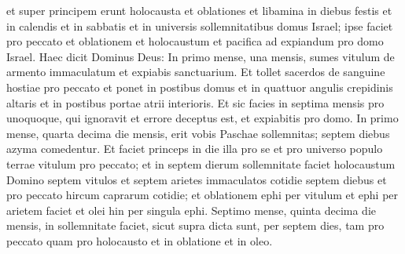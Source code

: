 \begin{biblechapter}
\begin{biblechapter}
\begin{biblechapter}
\begin{biblechapter}
\begin{biblechapter}
\begin{biblechapter}
\begin{biblechapter}
\begin{biblechapter}
\begin{biblechapter}
\begin{biblechapter}
\begin{biblechapter}
\begin{biblechapter}
\begin{biblechapter}
\begin{biblechapter}
\begin{biblechapter}
\begin{biblechapter}
\begin{biblechapter}
\begin{biblechapter}
\begin{biblechapter}
\begin{biblechapter}
\begin{biblechapter}
\begin{biblechapter}
\begin{biblechapter}
\begin{biblechapter}
\begin{biblechapter}
\begin{biblechapter}
\begin{biblechapter}
\begin{biblechapter}
\begin{biblechapter}
\begin{biblechapter}
\begin{biblechapter}
\begin{biblechapter}
\begin{biblechapter}
\begin{biblechapter}
\begin{biblechapter}
\begin{biblechapter}
\begin{biblechapter}
\begin{biblechapter}
\begin{biblechapter}
\begin{biblechapter}
\begin{biblechapter}
\begin{biblechapter}
\begin{biblechapter}
\begin{biblechapter}
\begin{biblechapter}
\verse et super principem erunt holocausta et oblationes et libamina in diebus festis et in calendis et in sabbatis et in universis sollemnitatibus domus Israel; ipse faciet pro peccato et oblationem et holocaustum et pacifica ad expiandum pro domo Israel.
 \verse Haec dicit Dominus Deus: In primo mense, una mensis, sumes vitulum de armento immaculatum et expiabis sanctuarium. 
\verse Et tollet sacerdos de sanguine hostiae pro peccato et ponet in postibus domus et in quattuor angulis crepidinis altaris et in postibus portae atrii interioris. 
\verse Et sic facies in septima mensis pro unoquoque, qui ignoravit et errore deceptus est, et expiabitis pro domo. 
\verse In primo mense, quarta decima die mensis, erit vobis Paschae sollemnitas; septem diebus azyma comedentur. 
\verse Et faciet princeps in die illa pro se et pro universo populo terrae vitulum pro peccato; 
\verse et in septem dierum sollemnitate faciet holocaustum Domino septem vitulos et septem arietes immaculatos cotidie septem diebus et pro peccato hircum caprarum cotidie; 
\verse et oblationem ephi per vitulum et ephi per arietem faciet et olei hin per singula ephi.
 \verse Septimo mense, quinta decima die mensis, in sollemnitate faciet, sicut supra dicta sunt, per septem dies, tam pro peccato quam pro holocausto et in oblatione et in oleo.
 

\end{biblechapter}
\end{biblechapter}
\end{biblechapter}
\end{biblechapter}
\end{biblechapter}
\end{biblechapter}
\end{biblechapter}
\end{biblechapter}
\end{biblechapter}
\end{biblechapter}
\end{biblechapter}
\end{biblechapter}
\end{biblechapter}
\end{biblechapter}
\end{biblechapter}
\end{biblechapter}
\end{biblechapter}
\end{biblechapter}
\end{biblechapter}
\end{biblechapter}
\end{biblechapter}
\end{biblechapter}
\end{biblechapter}
\end{biblechapter}
\end{biblechapter}
\end{biblechapter}
\end{biblechapter}
\end{biblechapter}
\end{biblechapter}
\end{biblechapter}
\end{biblechapter}
\end{biblechapter}
\end{biblechapter}
\end{biblechapter}
\end{biblechapter}
\end{biblechapter}
\end{biblechapter}
\end{biblechapter}
\end{biblechapter}
\end{biblechapter}
\end{biblechapter}
\end{biblechapter}
\end{biblechapter}
\end{biblechapter}
\end{biblechapter}
